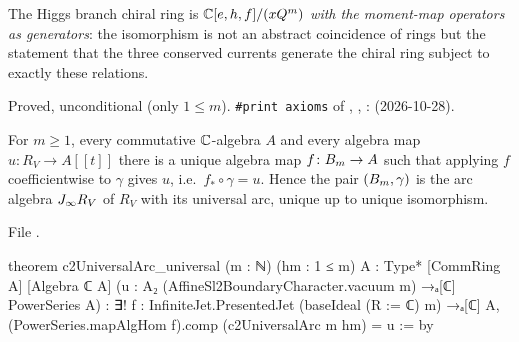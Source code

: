 \begin{physics}
The Higgs branch chiral ring is ${\mathbb{C}}[e,h,f]/(xQ^m)$ \emph{with the moment-map operators as generators}: the
isomorphism is not an abstract coincidence of rings but the statement that the three conserved currents generate the
chiral ring subject to exactly these relations.
\end{physics}

\begin{status}
Proved, unconditional (only $1\le m$). \texttt{\#print axioms} of , ,
:  (2026-10-28).
\end{status}

\begin{theorem}\label{l20:thm:univarc}
For $m\ge1$, every commutative ${\mathbb{C}}$-algebra $A$ and every algebra map $u\colon R_V\to A[[t]]$ there is a unique algebra map
$f\colon B_m\to A$ such that applying $f$ coefficientwise to $\gamma$ gives $u$, i.e.\ $f_*\circ\gamma=u$. Hence the pair
$(B_m,\gamma)$ is the arc algebra $J_\infty R_V$ of $R_V$ with its universal arc, unique up to unique isomorphism.
\end{theorem}
\noindent File .
\begin{leancode}
theorem c2UniversalArc_universal (m : ℕ) (hm : 1 ≤ m) {A : Type*} [CommRing A] [Algebra ℂ A]
    (u : A₂ (AffineSl2BoundaryCharacter.vacuum m) →ₐ[ℂ] PowerSeries A) :
    ∃! f : InfiniteJet.PresentedJet (baseIdeal (R := ℂ) m) →ₐ[ℂ] A,
      (PowerSeries.mapAlgHom f).comp (c2UniversalArc m hm) = u := by
\end{leancode}

